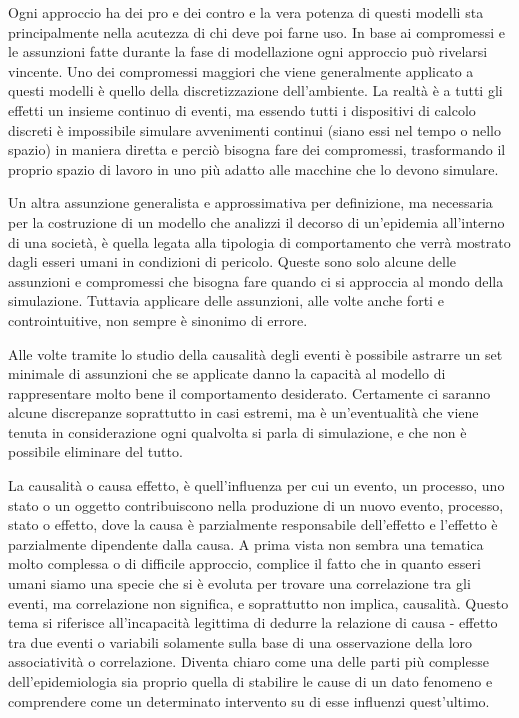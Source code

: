 Ogni approccio ha dei pro e dei contro e la vera potenza di questi modelli sta principalmente 
nella acutezza di chi deve poi farne uso. In base ai compromessi e le assunzioni fatte durante 
la fase di modellazione ogni approccio può rivelarsi vincente. 
Uno dei compromessi maggiori che viene generalmente applicato a questi modelli è 
quello della discretizzazione dell’ambiente. La realtà è a tutti gli effetti un insieme 
continuo di eventi, ma essendo tutti i dispositivi di calcolo discreti è impossibile simulare avvenimenti 
continui (siano essi nel tempo o nello spazio) in maniera diretta e perciò bisogna fare dei compromessi, 
trasformando il proprio spazio di lavoro in uno più adatto alle macchine che lo devono simulare. 

Un altra assunzione generalista e approssimativa per definizione, ma necessaria per la costruzione 
di un modello che analizzi il decorso di un’epidemia all’interno di una società, 
è quella legata alla tipologia di comportamento che verrà mostrato 
dagli esseri umani in condizioni di pericolo. 
Queste sono solo alcune delle assunzioni e compromessi che bisogna fare quando ci si approccia 
al mondo della simulazione. Tuttavia applicare delle assunzioni, 
alle volte anche forti e controintuitive, non sempre è sinonimo di errore. 

Alle volte tramite lo studio della causalità degli eventi è possibile astrarre un set minimale 
di assunzioni che se applicate danno la capacità al modello di rappresentare molto 
bene il comportamento desiderato. 
Certamente ci saranno alcune discrepanze soprattutto in casi estremi, 
ma è un’eventualità che viene tenuta in considerazione ogni qualvolta si parla di simulazione, 
e che non è possibile eliminare del tutto. 

La causalità o causa effetto, è quell’influenza per cui un evento, un processo, 
uno stato o un oggetto contribuiscono nella produzione di un nuovo evento, processo, 
stato o effetto, dove la causa è parzialmente responsabile dell’effetto e l’effetto 
è parzialmente dipendente dalla causa. 
A prima vista non sembra una tematica molto complessa o di difficile approccio, 
complice il fatto che in quanto esseri umani siamo una specie che si è evoluta per trovare una 
correlazione tra gli eventi, ma correlazione non significa, e soprattutto non implica, causalità. 
Questo tema si riferisce all’incapacità legittima di dedurre la relazione di causa - effetto tra due eventi 
o variabili solamente sulla base di una osservazione della loro associatività o correlazione. 
Diventa chiaro come una delle parti più complesse dell’epidemiologia sia 
proprio quella di stabilire le cause di un dato fenomeno e comprendere come 
un determinato intervento su di esse influenzi quest’ultimo. 

